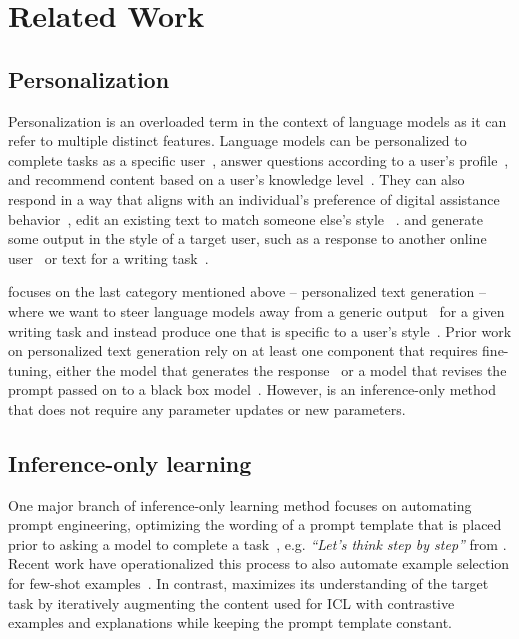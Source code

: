 \section{Related Work}

\subsection{Personalization}

Personalization is an overloaded term in the context of language models as it can refer to multiple distinct features. 
Language models can be personalized to complete tasks as a specific user~\cite{salemi2023lamp, zhuang2024hydramodelfactorizationframework}, answer questions according to a user's profile~\cite{kim2024fewshotpersonalizationllmsmisaligned, dutt-etal-2022-perkgqa}, and recommend content based on a user's knowledge level~\cite{wang2016personalized}. They can also respond in a way that aligns with an individual's preference of digital assistance behavior~\cite{jang2023personalized}, edit an existing text to match someone else's style~\cite{horvitz-etal-2024-tinystyler, patel2023lowresourceauthorshipstyletransfer} . and generate some output in the style of a target user, such as a response to another online user~\cite{liu-etal-2023-recap} or text for a writing task~\cite{shaikh2024show, kumar2024longlampbenchmarkpersonalizedlongform, li2024learning, mysore2023pearl}. 

\ours focuses on the last category mentioned above -- personalized text generation -- where we want to steer language models away from a generic output~\cite{li-etal-2016-diversity, zhang-etal-2021-trading, padmakumar2024does} for a given writing task and instead produce one that is specific to a user's style~\cite{rivera-soto-etal-2021-learning, wegmann-etal-2022-author}. 
Prior work on personalized text generation rely on at least one component that requires fine-tuning, either the model that generates the response~\cite{li2023teach, liu-etal-2023-recap, shaikh2024show, mysore2023pearl} or a model that revises the prompt passed on to a black box model~\cite{li2024learning}. 
However, \ours is an inference-only method that does not require any parameter updates or new parameters. 

\subsection{Inference-only learning}

One major branch of inference-only learning method focuses on automating prompt engineering, optimizing the wording of a prompt template that is placed prior to asking a model to complete a task~\cite{shin-etal-2020-autoprompt, zhou2023large, ma2024largelanguagemodelsgood, yang2024large, kim2024fewshotpersonalizationllmsmisaligned, ye-etal-2024-prompt}, e.g. \textit{``Let's think step by step''} from \cite{kojima2022large}. 
Recent work have operationalized this process to also automate example selection for few-shot examples~\cite{yuksekgonul2024textgrad, khattab2023dspy}. 
In contrast, \ours maximizes its understanding of the target task by iteratively augmenting the content used for ICL with contrastive examples and explanations while keeping the prompt template constant.

